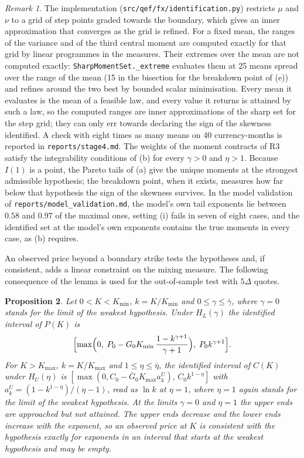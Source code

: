 \documentclass[11pt]{article}
\newtheorem{proposition}{Proposition}
\theoremstyle{remark}
\newtheorem{remark}[proposition]{Remark}
\begin{document}
\begin{remark}
The implementation (\texttt{src/qef/fx/identification.py}) restricts $\mu$ and $\nu$ to a grid of step points graded towards the boundary, which gives an inner approximation that converges as the grid is refined. For a fixed mean, the ranges of the variance and of the third central moment are computed exactly for that grid by linear programmes in the measures. Their extremes over the mean are not computed exactly: \texttt{SharpMomentSet.\_extreme} evaluates them at 25 means spread over the range of the mean (15 in the bisection for the breakdown point of (e)) and refines around the two best by bounded scalar minimisation. Every mean it evaluates is the mean of a feasible law, and every value it returns is attained by such a law, so the computed ranges are inner approximations of the sharp set for the step grid; they can only err towards declaring the sign of the skewness identified. A check with eight times as many means on 40 currency-months is reported in \texttt{reports/stage4.md}. The weights of the moment contracts of R3 satisfy the integrability conditions of (b) for every $\gamma>0$ and $\eta>1$. Because $I(1)$ is a point, the Pareto tails of (a) give the unique moments at the strongest admissible hypothesis; the breakdown point, when it exists, measures how far below that hypothesis the sign of the skewness survives. In the model validation of \texttt{reports/model\_validation.md}, the model's own tail exponents lie between $0.58$ and $0.97$ of the maximal ones, setting (i) fails in seven of eight cases, and the identified set at the model's own exponents contains the true moments in every case, as (b) requires.
\end{remark}

An observed price beyond a boundary strike tests the hypotheses and, if consistent, adds a linear constraint on the mixing measure. The following consequence of the lemma is used for the out-of-sample test with $5\Delta$ quotes.

\begin{proposition}
Let $0<K<K_{\min}$, $k=K/K_{\min}$ and $0\le\gamma\le\bar\gamma$, where $\gamma=0$ stands for the limit of the weakest hypothesis. Under $H_L(\gamma)$ the identified interval of $P(K)$ is
\[
\Bigl[\max\Bigl(0,\;P_0-G_0K_{\min}\,\frac{1-k^{\gamma+1}}{\gamma+1}\Bigr),\;P_0k^{\gamma+1}\Bigr].
\]
For $K>K_{\max}$, $k=K/K_{\max}$ and $1\le\eta\le\bar\eta$, the identified interval of $C(K)$ under $H_U(\eta)$ is $[\max(0,C_0-\bar G_0K_{\max}a^U_k),\,C_0k^{1-\eta}]$ with $a^U_k=(1-k^{1-\eta})/(\eta-1)$, read as $\ln k$ at $\eta=1$, where $\eta=1$ again stands for the limit of the weakest hypothesis. At the limits $\gamma=0$ and $\eta=1$ the upper ends are approached but not attained. The upper ends decrease and the lower ends increase with the exponent, so an observed price at $K$ is consistent with the hypothesis exactly for exponents in an interval that starts at the weakest hypothesis and may be empty.
\end{proposition}
\end{document}
